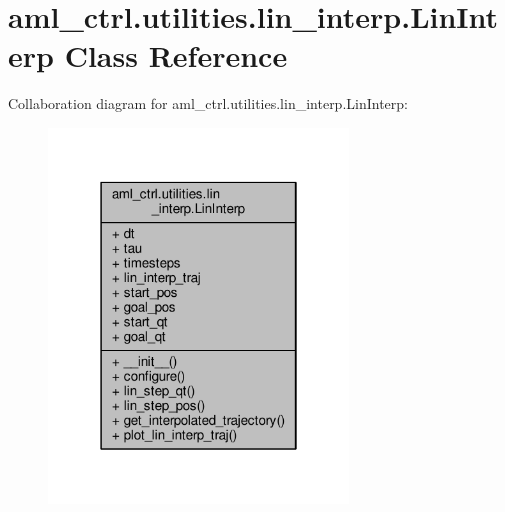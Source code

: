 \hypertarget{classaml__ctrl_1_1utilities_1_1lin__interp_1_1_lin_interp}{\section{aml\-\_\-ctrl.\-utilities.\-lin\-\_\-interp.\-Lin\-Interp Class Reference}
\label{classaml__ctrl_1_1utilities_1_1lin__interp_1_1_lin_interp}
}


Collaboration diagram for aml\-\_\-ctrl.\-utilities.\-lin\-\_\-interp.\-Lin\-Interp\-:\nopagebreak
\begin{figure}[H]
\begin{center}
\leavevmode
\includegraphics[width=226pt]{classaml__ctrl_1_1utilities_1_1lin__interp_1_1_lin_interp__coll__graph}
\end{center}
\end{figure}
